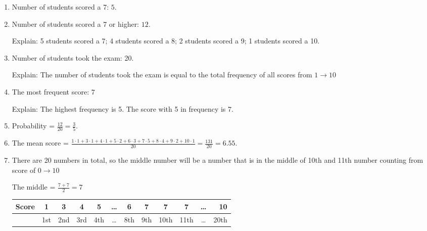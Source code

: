 \documentclass[12pt]{article}
\begin{document}
\begin{enumerate}
    \item Number of students scored a 7: $5$.
    
    \item Number of students scored a 7 or higher: $12$.\par
    Explain: 5 students scored a 7; 4 students scored a 8; 2 students scored a 9; 1 students scored a 10.
        
    \item Number of students took the exam: 20. \par
    Explain: The number of students took the exam is equal to the total frequency of all scores from $1 \to 10$
        
    \item The most frequent score: $7$ \par
    Explain: The highest frequency is 5. The score with 5 in frequency is 7.
        
    \item Probability = $\frac{12}{20}= \frac{3}{5}$.
        
    \item The mean score = $\frac{1\cdot 1+3\cdot 1+4\cdot 1+5\cdot 2+6\cdot 3+7\cdot 5+8\cdot 4+9\cdot 2+10\cdot 1}{20}=
    \frac{131}{20} = 6.55$.
        
    \item There are 20 numbers in total, so the middle number will be a number that is in the middle of 10th and 11th number counting from score of $0\to 10$ \par
    The middle = $\frac{7+7}{2} = 7$
        
    \begin{center}
        \begin{tabular}{l | c|c|c|c|c|c|c|c|c|c |r}
            Score & 1 & 3 & 4 & 5 & \dots & 6 & 7 & 7 & 7 & \dots & 10 \\
            \hline
            &1st &2nd &3rd &4th &\dots &8th &9th &10th &11th &\dots &20th \\
        \end{tabular}
    \end{center}
        
    \vspace{0.5cm}

\end{enumerate}

\vspace{1cm}
    
\end{document}
